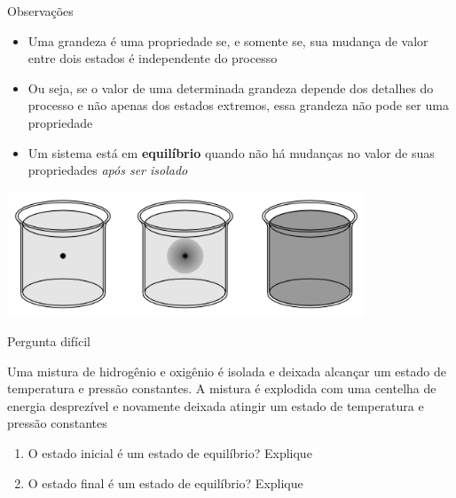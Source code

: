 \begin{frame}{Observações}
    \begin{itemize}
        \item Uma grandeza é uma propriedade se, e somente se, sua mudança de valor
            entre dois estados é independente do processo
        \item Ou seja, se o valor de uma determinada grandeza depende dos detalhes do
            processo e não apenas dos estados extremos, essa grandeza não pode ser uma propriedade
        \item Um sistema está em \textbf{equilíbrio} quando não há mudanças no valor de suas propriedades 
            \textit{após ser isolado}
    \end{itemize}
    \centering
    \includegraphics[width=0.8\textwidth]{images/termo4.png}
\end{frame}

\begin{frame}{Pergunta difícil}
    \begin{minipage}{\textwidth}
        Uma mistura de hidrogênio e oxigênio é isolada e deixada alcançar um estado de temperatura 
        e pressão constantes. A mistura é explodida com uma centelha de energia desprezível e novamente
        deixada atingir um estado de temperatura e pressão constantes
    \end{minipage}
    \begin{enumerate}
        \item O estado inicial é um estado de equilíbrio? Explique
        \item O estado final é um estado de equilíbrio? Explique
    \end{enumerate}
\end{frame}
